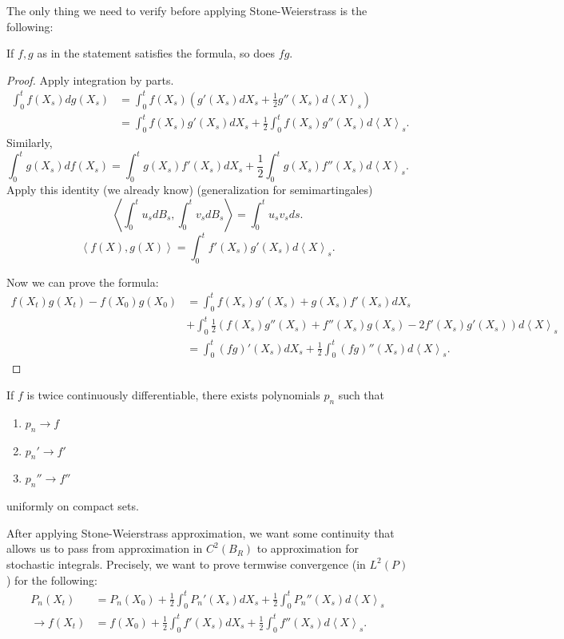 The only thing we need to verify before applying Stone-Weierstrass is the following:
\begin{claim}
	If $f, g$ as in the statement satisfies the formula, so does $f g$.
\end{claim}
\begin{proof}
	Apply integration by parts.
	\begin{align*}
		\int _0^t f(X_s) d g(X_s) 
		&= \int _0^t f(X_s) \left( g'(X_s) d X_s + \frac{1}{2} g''(X_s) d \left\langle X \right\rangle _s \right)  \\
		&= \int _0^t f(X_s) g'(X_s) d X_s + \frac{1}{2} \int _0^t f(X_s) g''(X_s) d \left\langle X \right\rangle _s 
	.\end{align*}
	Similarly,
	\[
		\int _0^t g(X_s) d f(X_s) = \int _0^t g(X_s) f'(X_s) d X_s + \frac{1}{2} \int _0^t g(X_s) f''(X_s) d \left\langle X \right\rangle _s
	.\] 
	Apply this identity (we already know) (generalization for semimartingales)
	\[
		\left\langle \int _0^t u_s d B_s, \int _0^t v_s d B_s \right\rangle = \int _0^t u_s v_s d s
	.\] 
	\[
		\left\langle f(X), g(X) \right\rangle 
		= \int _0^t f'(X_s) g'(X_s) d \left\langle X \right\rangle _s
	.\] 
	
	Now we can prove the formula:
	\begin{align*}
		f(X_t) g(X_t) - f(X_0) g(X_0)
		&= \int _0^t f(X_s) g'(X_s) + g(X_s) f'(X_s) d X_s\\
		&+ \int _0^t \frac{1}{2} \left( f(X_s) g''(X_s) + f''(X_s) g(X_s) - 2 f'(X_s) g'(X_s) \right) d\left\langle X \right\rangle _s \\
		&= \int _0^t (fg)' (X_s) dX_s + \frac{1}{2} \int _0^t (fg)'' (X_s) d \left\langle X \right\rangle _s 
	.\end{align*}
\end{proof}

\begin{fact}
	If $f$ is twice continuously differentiable, there exists polynomials $p_n$ such that
	\begin{enumerate}
		\item $p_n \to f$
		\item $p_n' \to  f'$
		\item $p_n'' \to  f''$
	\end{enumerate}
	uniformly on compact sets.
\end{fact}




After applying Stone-Weierstrass approximation, we want some continuity that allows us to pass from approximation in $C^2(B_R)$ to approximation for stochastic integrals. Precisely, we want to
prove termwise convergence (in $L^2(P)$) for the following:
\begin{align*}
	 P_n(X_t) &= P_n(X_0) + \frac{1}{2} \int _0^t P_n'(X_s) dX_s + \frac{1}{2} \int _0^t P_n'' (X_s) d \left\langle X \right\rangle _s\\
	\to 
	f(X_t) &= f(X_0) + \frac{1}{2}\int _0^t	f'(X_s) d X_s + \frac{1}{2} \int _0^t f''(X_s) d\left\langle X \right\rangle _s
.\end{align*}

